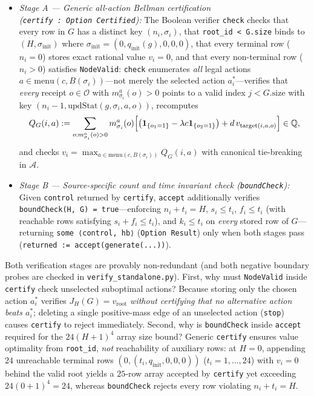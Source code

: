 \documentclass[11pt,a4paper]{article}
\providecommand{\tightlist}{\setlength{\itemsep}{2pt}\setlength{\parskip}{0pt}}
\begin{document}
\begin{enumerate}
  \begin{itemize}
  \tightlist
  \item
    \emph{Stage A --- Generic all-action Bellman certification
    (\texttt{certify\ :\ Option\ Certified}):} The Boolean verifier
    \texttt{check} checks that every row in \(G\) has a distinct key
    \((n_i, \sigma_i)\), that \texttt{root\_id\ \textless{}\ G.size}
    binds to \((H, \sigma_{\mathrm{init}})\) where
    \(\sigma_{\mathrm{init}} = (0, q_{\mathrm{init}}(g), 0, 0, 0)\),
    that every terminal row (\(n_i = 0\)) stores exact rational value
    \(v_i = 0\), and that every non-terminal row (\(n_i > 0\)) satisfies
    \texttt{NodeValid}: \texttt{check} enumerates \emph{all} legal
    actions \(a \in \mathrm{menu}(c, B(\sigma_i))\)---not merely the
    selected action \(a_i^*\)---verifies that \emph{every} receipt
    \(o \in \mathcal{O}\) with \(m_{\sigma_i}^a(o) > 0\) points to a
    valid index \(j < G.\mathrm{size}\) with key
    \((n_i - 1, \mathrm{updStat}(g, \sigma_i, a, o))\), recomputes
    \[Q_G(i, a) := \sum_{o : m_{\sigma_i}^a(o) > 0} m_{\sigma_i}^a(o)\Bigl[\bigl(\mathbf{1}_{\{o_1 = 1\}} - \lambda c \mathbf{1}_{\{o_2 = 1\}}\bigr) + d\, v_{\mathrm{target}(i, a, o)}\Bigr] \in \mathbb{Q},\]
    and checks
    \(v_i = \max_{a \in \mathrm{menu}(c, B(\sigma_i))} Q_G(i, a)\) with
    canonical tie-breaking in \(\mathcal{A}\).
  \item
    \emph{Stage B --- Source-specific count and time invariant check
    (\texttt{boundCheck}):} Given \texttt{control} returned by
    \texttt{certify}, \texttt{accept} additionally verifies
    \texttt{boundCheck(H,\ G)\ =\ true}---enforcing \(n_i + t_i = H\),
    \(s_i \le t_i\), \(f_i \le t_i\) (with reachable rows satisfying
    \(s_i + f_i \le t_i\)), and \(k_i \le t_i\) on \emph{every} stored
    row of \(G\)---returning \texttt{some\ ⟨control,\ hb⟩}
    (\texttt{Option\ Result}) only when both stages pass
    (\texttt{returned\ :=\ accept(generate(...))}).
  \end{itemize}
\end{enumerate}

Both verification stages are provably non-redundant (and both negative
boundary probes are checked in \texttt{verify\_standalone.py}). First,
why must \texttt{NodeValid} inside \texttt{certify} check unselected
suboptimal actions? Because storing only the chosen action \(a_i^*\)
verifies \(J_H(G) = v_{\mathrm{root}}\) \emph{without certifying that no
alternative action beats \(a_i^*\)}; deleting a single positive-mass
edge of an unselected action (\texttt{stop}) causes \texttt{certify} to
reject immediately. Second, why is \texttt{boundCheck} inside
\texttt{accept} required for the \(24(H+1)^4\) array size bound? Generic
\texttt{certify} ensures value optimality from \texttt{root\_id},
\emph{not} reachability of auxiliary rows: at \(H = 0\), appending
\(24\) unreachable terminal rows
\((0, (t_i, q_{\mathrm{init}}, 0, 0, 0))\) (\(t_i = 1, \dots, 24\)) with
\(v_i = 0\) behind the valid root yields a \(25\)-row array accepted by
\texttt{certify} yet exceeding \(24(0+1)^4 = 24\), whereas
\texttt{boundCheck} rejects every row violating \(n_i + t_i = H\).
\end{document}
